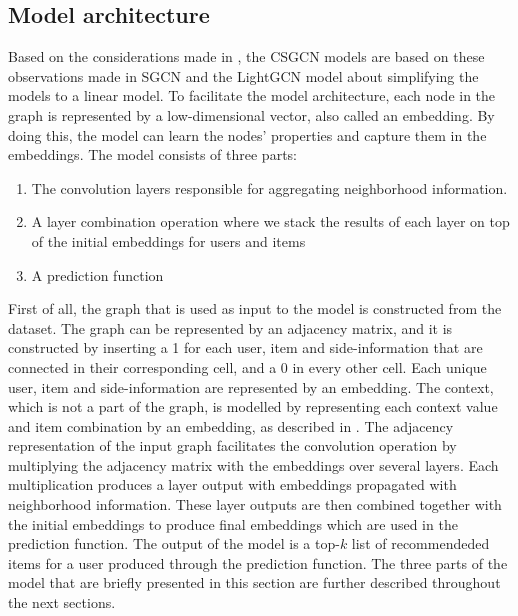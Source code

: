 \subsection{Model architecture}\label{subsec:csgcn_is_model_architecture}
Based on the considerations made in , the CSGCN models are based on these observations made in SGCN \cite{SimplifyingGCN} and the LightGCN model \cite{LightGCN} about simplifying the models to a linear model.
To facilitate the model architecture, each node in the graph is represented by a low-dimensional vector, also called an embedding.
By doing this, the model can learn the nodes' properties and capture them in the embeddings.
The model consists of three parts:
\begin{enumerate}
    \item The convolution layers responsible for aggregating neighborhood information.
    \item A layer combination operation where we stack the results of each layer on top of the initial embeddings for users and items
    \item A prediction function
\end{enumerate}
First of all, the graph that is used as input to the model is constructed from the dataset.
The graph can be represented by an adjacency matrix, and it is constructed by inserting a 1 for each user, item and side-information that are connected in their corresponding cell, and a 0 in every other cell.
Each unique user, item and side-information are represented by an embedding.
The context, which is not a part of the graph, is modelled by representing each context value and item combination by an embedding, as described in .
The adjacency representation of the input graph facilitates the convolution operation by multiplying the adjacency matrix with the embeddings over several layers.
Each multiplication produces a layer output with embeddings propagated with neighborhood information.
These layer outputs are then combined together with the initial embeddings to produce final embeddings which are used in the prediction function.
The output of the model is a top-$k$ list of recommendeded items for a user produced through the prediction function.
The three parts of the model that are briefly presented in this section are further described throughout the next sections.


